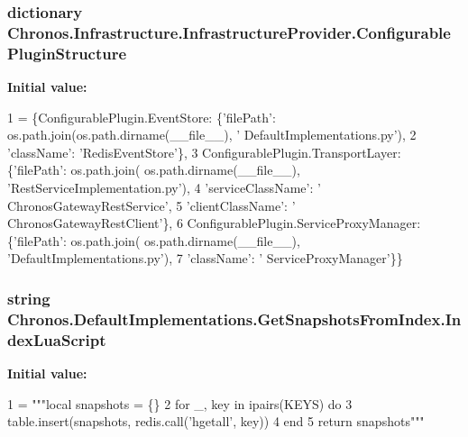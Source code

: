 \subsubsection[{\texorpdfstring{Configurable\+Plugin\+Structure}{ConfigurablePluginStructure}}]{\setlength{\rightskip}{0pt plus 5cm}dictionary Chronos.\+Infrastructure.\+Infrastructure\+Provider.\+Configurable\+Plugin\+Structure\hspace{0.3cm}{\ttfamily [static]}}\hypertarget{group__Chronos_gafc3ebfda2c86173b14e27a6ef2df013d}{}\label{group__Chronos_gafc3ebfda2c86173b14e27a6ef2df013d}
{\bfseries Initial value\+:}
\begin{DoxyCode}
1 = \{ConfigurablePlugin.EventStore: \{\textcolor{stringliteral}{'filePath'}:  os.path.join(os.path.dirname(\_\_file\_\_), \textcolor{stringliteral}{'
      DefaultImplementations.py'}),
2                                                                    \textcolor{stringliteral}{'className'}: \textcolor{stringliteral}{'RedisEventStore'}\},
3                                    ConfigurablePlugin.TransportLayer: \{\textcolor{stringliteral}{'filePath'}: os.path.join(
      os.path.dirname(\_\_file\_\_), \textcolor{stringliteral}{'RestServiceImplementation.py'}),
4                                                                        \textcolor{stringliteral}{'serviceClassName'}: \textcolor{stringliteral}{'
      ChronosGatewayRestService'},
5                                                                        \textcolor{stringliteral}{'clientClassName'}: \textcolor{stringliteral}{'
      ChronosGatewayRestClient'}\},
6                                    ConfigurablePlugin.ServiceProxyManager: \{\textcolor{stringliteral}{'filePath'}: os.path.join(
      os.path.dirname(\_\_file\_\_), \textcolor{stringliteral}{'DefaultImplementations.py'}),
7                                                                             \textcolor{stringliteral}{'className'}: \textcolor{stringliteral}{'
      ServiceProxyManager'}\}\}
\end{DoxyCode}
\subsubsection[{\texorpdfstring{Index\+Lua\+Script}{IndexLuaScript}}]{\setlength{\rightskip}{0pt plus 5cm}string Chronos.\+Default\+Implementations.\+Get\+Snapshots\+From\+Index.\+Index\+Lua\+Script\hspace{0.3cm}{\ttfamily [static]}}\hypertarget{group__Chronos_gacc6134db3c626bf7e954a3893fbf32fd}{}\label{group__Chronos_gacc6134db3c626bf7e954a3893fbf32fd}
{\bfseries Initial value\+:}
\begin{DoxyCode}
1 = \textcolor{stringliteral}{"""local snapshots = \{\}}
2 \textcolor{stringliteral}{                    for \_, key in ipairs(KEYS) do}
3 \textcolor{stringliteral}{                        table.insert(snapshots, redis.call('hgetall', key))}
4 \textcolor{stringliteral}{                    end}
5 \textcolor{stringliteral}{                    return snapshots"""}
\end{DoxyCode}
